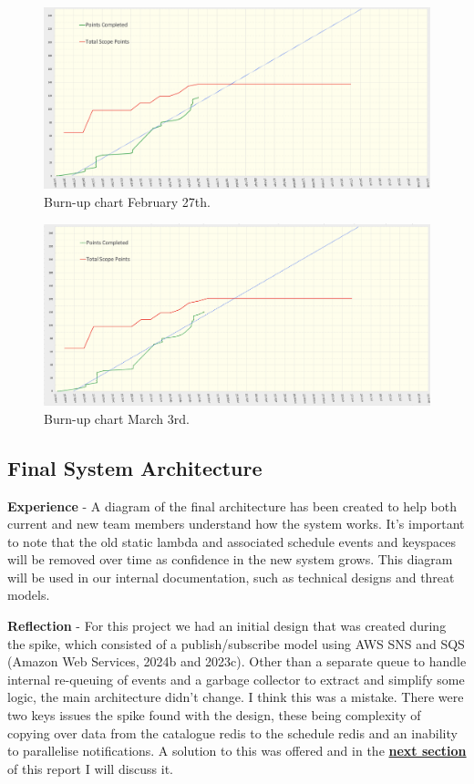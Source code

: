   \begin{figure}[H]
    \centering
    \includegraphics[width=12cm]{assets/outputs/burnups/02-27.png}
    \caption{Burn-up chart February 27th.}
    \label{fig:burnup5}
  \end{figure}

  \begin{figure}[H]
    \centering
    \includegraphics[width=12cm]{assets/outputs/burnups/03-03.png}
    \caption{Burn-up chart March 3rd.}
    \label{fig:burnup6}
  \end{figure}

  \newpage
  \subsection{Final System Architecture}

  \textbf{Experience} - A diagram of the final architecture has been created to help both current and new team members understand how the system works.
  It's important to note that the old static lambda and associated schedule events and keyspaces will be removed over time as confidence in the new system 
  grows. This diagram will be used in our internal documentation, such as technical designs and threat models.

  \vspace{0.2cm}
  \textbf{Reflection} - For this project we had an initial design that was created during the spike, which consisted of a publish/subscribe model using
  AWS SNS and SQS (Amazon Web Services, 2024b and 2023c). Other than a separate queue to handle internal re-queuing of events and a garbage collector to 
  extract and simplify some logic, the main architecture didn't change. I think this was a mistake. There were two keys issues the spike found with the design,
  these being complexity of copying over data from the catalogue redis to the schedule redis and an inability to parallelise notifications. A solution to this 
  was offered and in the \hyperref[sec:dynamo]{\textbf{next section}} of this report I will discuss it. 

